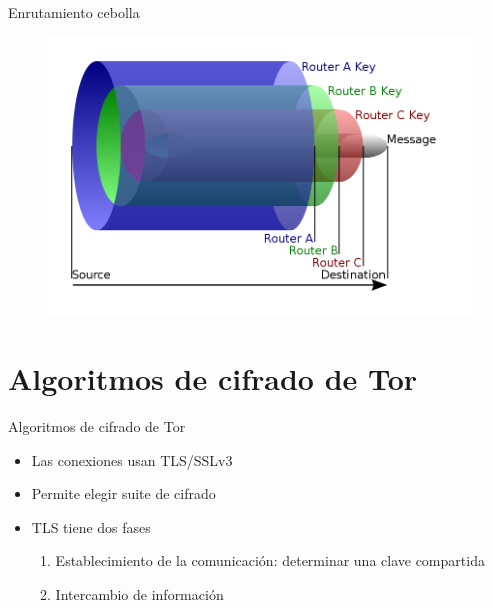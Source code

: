 \documentclass[spanish]{beamer}
\begin{document}
\begin{frame}{Enrutamiento cebolla}

\begin{figure}[h]
  \includegraphics[width=\textwidth]{OR4.png}
  \label{fig:or4}
\end{figure}

\end{frame}

\section{Algoritmos de cifrado de Tor}

\begin{frame}{Algoritmos de cifrado de Tor}{}

  \begin{itemize}
    \item Las conexiones usan TLS/SSLv3

    \item Permite elegir suite de cifrado

    \item TLS tiene dos fases \begin{enumerate}
      \item Establecimiento de la comunicación: determinar una clave compartida
      \item Intercambio de información
    \end{enumerate}
  \end{itemize}

\end{frame}
\end{document}
